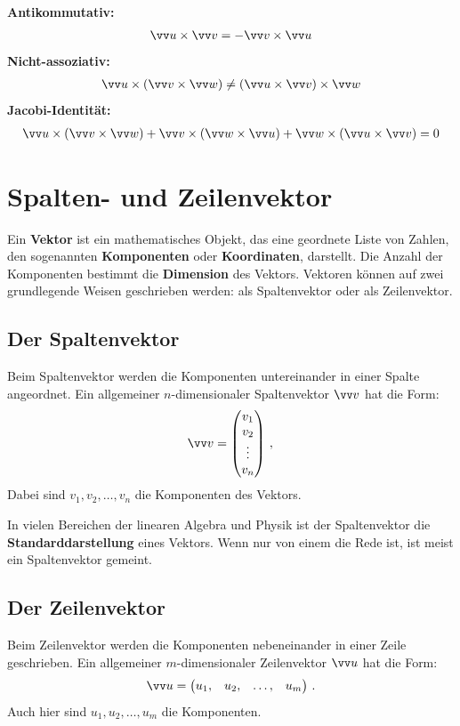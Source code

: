 \textbf{Antikommutativ:}
\begin{align*}
    \ivec{u} \times \ivec{v} = -\ivec{v} \times \ivec{u}
\end{align*}
\textbf{Nicht-assoziativ:}
\begin{align*}
    \ivec{u} \times (\ivec{v} \times \ivec{w}) \neq (\ivec{u} \times \ivec{v}) \times \ivec{w}
\end{align*}
\textbf{Jacobi-Identität:}
\begin{align*}
    \ivec{u} \times (\ivec{v} \times \ivec{w}) + \ivec{v} \times (\ivec{w} \times \ivec{u}) + \ivec{w} \times (\ivec{u} \times \ivec{v}) = 0
\end{align*}

\section{Spalten- und Zeilenvektor}\label{sec: Spalten_vs_Zeilenvektor}
Ein \textbf{Vektor} ist ein mathematisches Objekt, das eine geordnete Liste von Zahlen, den sogenannten \textbf{Komponenten} oder \textbf{Koordinaten}, darstellt. Die Anzahl der Komponenten bestimmt die \textbf{Dimension} des Vektors. Vektoren können auf zwei grundlegende Weisen geschrieben werden: als Spaltenvektor oder als Zeilenvektor.

\subsection*{Der Spaltenvektor}
Beim Spaltenvektor werden die Komponenten untereinander in einer Spalte angeordnet. Ein allgemeiner $n$-dimensionaler Spaltenvektor $\ivec{v}$ hat die Form:
\begin{equation}
    \ivec{v} = \begin{pmatrix}
    v_1 \\
    v_2 \\
    \vdots \\
    v_n
    \end{pmatrix}\mComma
\end{equation}
Dabei sind $v_1, v_2, \dots, v_n$ die Komponenten des Vektors.

In vielen Bereichen der linearen Algebra und Physik ist der Spaltenvektor die \textbf{Standarddarstellung} eines Vektors. Wenn nur von einem  die Rede ist, ist meist ein Spaltenvektor gemeint.

\subsection*{Der Zeilenvektor}
Beim Zeilenvektor werden die Komponenten nebeneinander in einer Zeile geschrieben. Ein allgemeiner $m$-dimensionaler Zeilenvektor $\ivec{u}$ hat die Form:
\begin{equation}
    \ivec{u} = \begin{pmatrix} u_1, & u_2, & \dots, & u_m \end{pmatrix}\mDot
\end{equation}
Auch hier sind $u_1, u_2, \dots, u_m$ die Komponenten.

